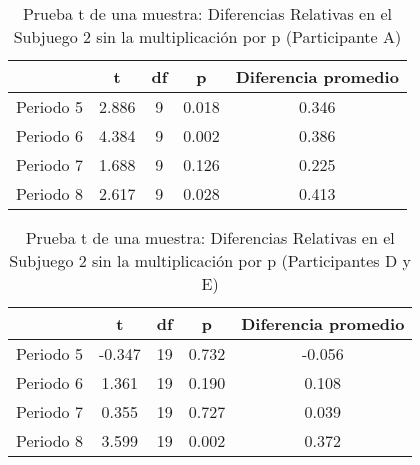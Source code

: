 \begin{table}[h]
\caption[Prueba t de una muestra: Diferencias Relativas en el Subjuego 2 sin la multioplicación por $p$ (Participante A)]{Prueba t de una muestra: Diferencias Relativas en el Subjuego 2 sin la multiplicación por p (Participante A)}
\label{DN-S1}
\centering
\begin{tabular}{l | c c c | c}
\toprule
\textbf{} & \textbf{t} & \textbf{df} & \textbf{p} & \textbf{Diferencia promedio}\\
\midrule
Periodo 5 & 2.886 & 9 & 0.018 & 0.346\\
Periodo 6 & 4.384 & 9 & 0.002 & 0.386\\
Periodo 7 & 1.688 & 9 & 0.126 & 0.225\\
Periodo 8 & 2.617 & 9 & 0.028 & 0.413\\
\bottomrule
\end{tabular}
\end{table}











\begin{table}[h]
\caption[Prueba t de una muestra: Diferencias Relativas en el Subjuego 2 sin la multiplicación por $p$ (Participantes D y E)]{Prueba t de una muestra: Diferencias Relativas en el Subjuego 2 sin la multiplicación por p (Participantes D y E)}
\label{DN-S1}
\centering
\begin{tabular}{l | c c c | c}
\toprule
\textbf{} & \textbf{t} & \textbf{df} & \textbf{p} & \textbf{Diferencia promedio}\\
\midrule
Periodo 5 & -0.347 & 19 & 0.732 & -0.056\\
Periodo 6 & 1.361 & 19 & 0.190 & 0.108\\
Periodo 7 & 0.355 & 19 & 0.727 & 0.039\\
Periodo 8 & 3.599 & 19 & 0.002 & 0.372\\
\bottomrule
\end{tabular}
\end{table}